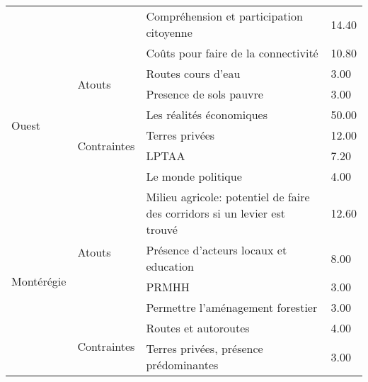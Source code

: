 \begin{table}[h!]
\begin{tabular}{m{}lm{}l}
                       &                              & Compréhension et participation citoyenne            & 14.40 \\ \cline{3-4} 
                       &                              & Coûts pour faire de la connectivité                 & 10.80 \\ \hline
\multirow{6}{*}{Ouest} & \multirow{2}{*}{Atouts}      & Routes cours d'eau                                  & 3.00  \\ \cline{3-4} 
                       &                              & Presence de sols pauvre                             & 3.00  \\ \cline{2-4} 
                       & \multirow{4}{*}{Contraintes} & Les réalités économiques                            & 50.00 \\ \cline{3-4} 
                       &                              & Terres privées                                      & 12.00 \\ \cline{3-4} 
                       &                              & LPTAA                                               & 7.20  \\ \cline{3-4} 
                       &                              & Le monde politique                                  & 4.00  \\ \hline
\multirow{6}{*}{Montérégie} &
  \multirow{4}{*}{Atouts} &
  Milieu agricole: potentiel de faire des corridors si un levier est trouvé &
  12.60 \\ \cline{3-4} 
                       &                              & Présence d'acteurs locaux et education              & 8.00  \\ \cline{3-4} 
                       &                              & PRMHH                                               & 3.00  \\ \cline{3-4} 
                       &                              & Permettre l'aménagement forestier                   & 3.00  \\ \cline{2-4} 
                       & \multirow{2}{*}{Contraintes} & Routes et autoroutes                                & 4.00  \\ \cline{3-4} 
                       &                              & Terres privées, présence prédominantes              & 3.00  \\ \hline
\end{tabular}
\end{table}

